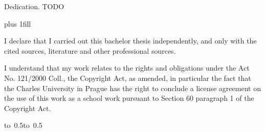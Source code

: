 \documentclass[12pt,a4paper]{report}
\let\openright=\clearpage
\begin{document}
\newpage



\openright

\noindent
Dedication. TODO

\newpage


\vglue 0pt plus 1fill

\noindent
I declare that I carried out this bachelor thesis independently, and only with the cited
sources, literature and other professional sources.

\medskip\noindent
I understand that my work relates to the rights and obligations under the Act No.
121/2000 Coll., the Copyright Act, as amended, in particular the fact that the Charles
University in Prague has the right to conclude a license agreement on the use of this
work as a school work pursuant to Section 60 paragraph 1 of the Copyright Act.

\vspace{10mm}

\hbox{\hbox to 0.5\hbox to 0.5}

\vspace{20mm}
\newpage

\end{document}
